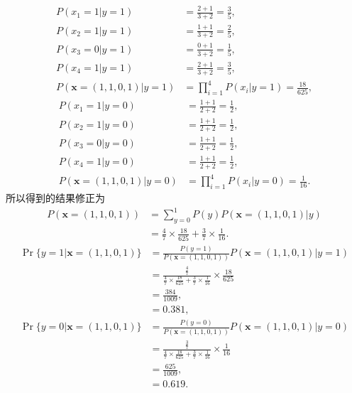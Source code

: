 \documentclass{article}
\begin{document}
        \begin{align}
            P(x_1 = 1 \left| y = 1 \right.) &= \frac{2+1}{3+2} = \frac{3}{5},\\
            P(x_2 = 1 \left| y = 1 \right.) &= \frac{1+1}{3+2} = \frac{2}{5},\\
            P(x_3 = 0 \left| y = 1 \right.) &= \frac{0+1}{3+2} = \frac{1}{5},\\
            P(x_4 = 1 \left| y = 1 \right.) &= \frac{2+1}{3+2} = \frac{3}{5},\\
            P(\boldsymbol{x} = (1,1,0,1) \left| y=1 \right.) &= \prod_{i=1}^4 P(x_i \left| y=1 \right.) = \frac{18}{625},
        \end{align}
        \begin{align}
            P(x_1 = 1 \left| y = 0 \right.) &= \frac{1+1}{2+2} = \frac{1}{2},\\
            P(x_2 = 1 \left| y = 0 \right.) &= \frac{1+1}{2+2} = \frac{1}{2},\\
            P(x_3 = 0 \left| y = 0 \right.) &= \frac{1+1}{2+2} = \frac{1}{2},\\
            P(x_4 = 1 \left| y = 0 \right.) &= \frac{1+1}{2+2} = \frac{1}{2},\\
            P(\boldsymbol{x} = (1,1,0,1) \left| y=0 \right.) &= \prod_{i=1}^4 P(x_i \left| y=0 \right.) = \frac{1}{16}.
        \end{align}
        所以得到的结果修正为
        \begin{equation}
            \begin{aligned}
                P(\boldsymbol{x} = (1,1,0,1)) &= \sum_{y = 0}^1 P(y) P(\boldsymbol{x} = (1,1,0,1) \left| y \right.)\\
                        &= \frac{4}{7} \times \frac{18}{625} + \frac{3}{7} \times \frac{1}{16}.
            \end{aligned}
        \end{equation}
        \begin{align}
            \Pr\{ y=1 | \mathbf{x}=(1,1,0,1) \} &= \frac{P(y=1)}{P(\boldsymbol{x} = (1,1,0,1))} P(\boldsymbol{x}=(1,1,0,1) \left| y=1 \right.)\\
                                                &= \frac{\frac{4}{7}}{\frac{4}{7} \times \frac{18}{625} + \frac{3}{7} \times \frac{1}{16}} \times \frac{18}{625}\\
                                                &= \frac{384}{1009},\\
                                                &= 0.381,\\
            \Pr\{ y=0 | \mathbf{x}=(1,1,0,1) \} &= \frac{P(y=0)}{P(\boldsymbol{x} = (1,1,0,1))} P(\boldsymbol{x}=(1,1,0,1) \left| y=0 \right.)\\
                                                &= \frac{\frac{3}{7}}{\frac{4}{7} \times \frac{18}{625} + \frac{3}{7} \times \frac{1}{16}} \times \frac{1}{16}\\
                                                &= \frac{625}{1009},\\
                                                &= 0.619.
        \end{align}
\end{document}
